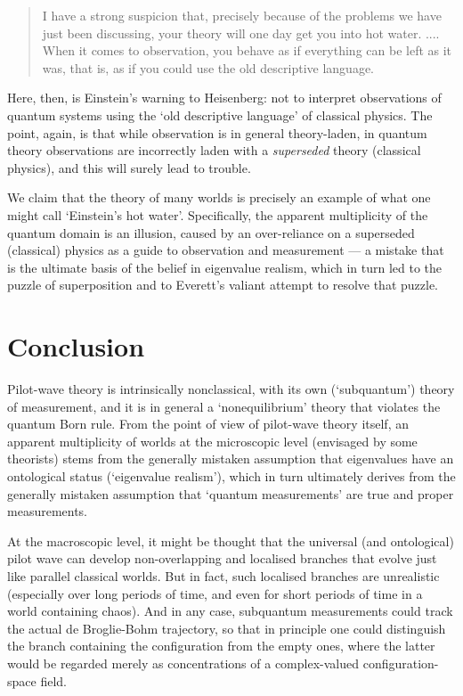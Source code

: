 \documentclass[12pt]{article}%
\begin{document}
\begin{quote}
I have a strong suspicion that, precisely because of the problems we have just
been discussing, your theory will one day get you into hot water. .... When it
comes to observation, you behave as if everything can be left as it was, that
is, as if you could use the old descriptive language.
\end{quote}
Here, then, is Einstein's warning to Heisenberg: not to interpret
observations of quantum systems using the `old descriptive language' of
classical physics. The point, again, is that while observation is in general
theory-laden, in quantum theory observations are incorrectly laden with a
\textit{superseded }theory (classical physics), and this will surely lead to trouble.

We claim that the theory of many worlds is precisely an example of what one
might call `Einstein's hot water'. Specifically, the apparent multiplicity of
the quantum domain is an illusion, caused by an over-reliance on a superseded
(classical) physics as a guide to observation and measurement --- a mistake
that is the ultimate basis of the belief in eigenvalue realism, which in turn
led to the puzzle of superposition and to Everett's valiant attempt to resolve
that puzzle.

\section{Conclusion}

Pilot-wave theory is intrinsically nonclassical, with its own (`subquantum')
theory of measurement, and it is in general a `nonequilibrium' theory that
violates the quantum Born rule. From the point of view of pilot-wave theory
itself, an apparent multiplicity of worlds at the microscopic level (envisaged
by some theorists) stems from the generally mistaken assumption that
eigenvalues have an ontological status (`eigenvalue realism'), which in turn
ultimately derives from the generally mistaken assumption that `quantum
measurements' are true and proper measurements.

At the macroscopic level, it might be thought that the universal (and
ontological) pilot wave can develop non-overlapping and localised branches
that evolve just like parallel classical worlds. But in fact, such localised
branches are unrealistic (especially over long periods of time, and even for
short periods of time in a world containing chaos). And in any case,
subquantum measurements could track the actual de Broglie-Bohm trajectory, so
that in principle one could distinguish the branch containing the
configuration from the empty ones, where the latter would be regarded merely
as concentrations of a complex-valued configuration-space field.
\end{document}
